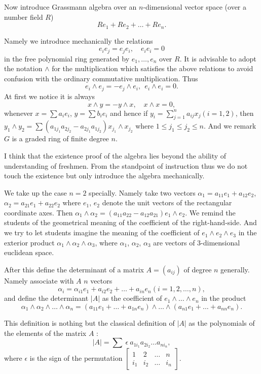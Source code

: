 Now introduce Grassmann algebra over an $n$-dimensional vector space
(over a number field $R$)
$$
Re_1 + Re_2 + \ldots + Re_n .
$$

Namely we introduce mechanically the relations
$$
e_i e_j = e_j e_i, \quad e_i e_i = 0
$$
in the free polynomial ring generated by $e_1, \ldots, e_n$ over
$R$. It is advisable to adopt the notation $\wedge$ for the
multiplication which satisfies the above relations to avoid confusion
with the ordinary commutative multiplication. Thus
$$
e_i \wedge e_j = - e_j \wedge e_i, ~~ e_i \wedge e_i = 0.
$$\pageoriginale
At first we notice it is always
$$
x \wedge y = - y \wedge x, \quad x \wedge x = 0,
$$
whenever $x =\sum a_i e_i$, $y = \sum b_i e_i$ and hence if $y_i =
\sum\limits^n_{j=1} a_{ij} x_j(i = 1,2)$, then $y_1 \wedge y_2 = \sum
(a_{1j_1} a_{2j_2} - a_{2j_1} a_{1j_2}) x_{j_1} \wedge x_{j_2}$ where
$1 \leqslant j_1 \leqslant j_2 \leqslant n$. And we remark $G$ is a
graded ring of finite degree $n$.

I think  that the existence proof of the algebra lies beyond the
ability of understanding of freshmen. From the standpoint of
instruction thus we do not touch the existence but only introduce the
algebra mechanically.

We take up the case $n=2$ specially. Namely take two vectors $\alpha_1
= a_{11} e_1 + a_{12} e_2$, $\alpha_2 = a_{21} e_1 + a_{22} e_2$ where
$e_1$, $e_2$ denote the unit vectors of the rectangular coordinate
axes. Then $\alpha_1 \wedge \alpha_2 = (a_{11} a_{22} -a_{12} a_{21})
e_1 \wedge e_2$. We remind the students of the geometrical meaning of
the coefficient of the right-hand-side. And we try to let students
imagine the meaning of the coefficient of $e_1 \wedge e_2 \wedge e_3$
in the exterior product $\alpha_1 \wedge \alpha_2 \wedge \alpha_3$,
where $\alpha_1$, $\alpha_2$, $\alpha_3$ are vectors of 3-dimensional
euclidean space.

After this define the determinant of a matrix $A = (a_{ij})$ of degree
$n$ generally. Namely associate with $A$ $n$ vectors
$$
\alpha_i = \alpha_{i1} e_1  + a_{i2} e_2 + \ldots + a_{in} e_n (i = 1,
2, \ldots, n),
$$
and define the determinant $|A|$ as the coefficient of $e_1 \wedge
\ldots \wedge e_n$ in the product
$$
\alpha_1 \wedge \alpha_2 \wedge \ldots \wedge \alpha_n = (a_{11} e_1 +
\ldots + a_{1n} e_n) \wedge \ldots \wedge (a_{n1} e_1 + \ldots +
a_{nn} e_n).
$$

This definition is nothing but the classical definition of $|A|$ as
the polynomials of the elements of the matrix $A$ :
$$
|A| = \sum ~\epsilon ~a_{1i_1} a_{2i_2} \ldots a_{ni_n},
$$
where $\epsilon$ is the sign of the permutation $\begin{bmatrix}
1&2&\ldots & n\\
i_1 &i_2 &\ldots &i_n \end{bmatrix}$.

